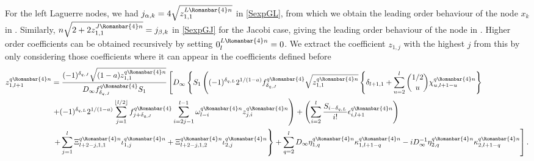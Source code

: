 \documentclass[11pt]{article}
\newcommand{\lln}{L{\tiny\Rleft} n}
\newcommand{\qg}{q}
\newcommand{\ql}{L}
\newcommand{\qj}{J}
\newcommand{\rl}{{\scriptsize \Romanbar{4}} }
\newcommand{\pn}{n}
\numberwithin{equation}{section}
\newcommand{\Rleft}{\Romanbar{4}}
\begin{document}
For the left Laguerre nodes, we had $j_{\alpha,k}= 4\sqrt{z_{1,1}^{\lln}}$ in \cref{SexpGL}, from which we obtain the leading order behaviour of the node $x_k$ in \cite[(5.1)]{quadr}. %
Similarly, $n\sqrt{2+2z_{1,1}^{\qj\rl\pn}} = j_{\beta,k}$ in \cref{SexpGJ} for the Jacobi case, giving the leading order behaviour of the node in \cite[(6.1)]{quadr}. %
Higher order coefficients can be obtained recursively by setting $0_l^{\ql\rl\pn}=0$. We extract the coefficient $z_{1,j}$ with the highest $j$ from this by only considering those coefficients where it can appear in the coefficients defined before
\begin{align}
	z_{1,l+1}^{\qg\rl\pn} & = \frac{ (-1)^{\delta_{\qg,\qj}} \sqrt{ (1-a) z_{1,1}^{\qg\rl\pn}} }{D_\infty  f_{\delta_{\qg,\qj}}^{\qg\rl} S_1 } \left[ D_\infty \left\{ S_1 \left( (-1)^{\delta_{\qg,\ql}} 2^{1/(1-a)} f_{\delta_{\qg,\qj}}^{\qg\rl} \sqrt{z_{1,1}^{\qg\rl\pn}} \left\{ \delta_{l+1,1} +  \sum_{u=2}^{l} {1/2 \choose u} \chi_{u,l+1-u}^{\qg\rl\pn} \right\} \right. \right. \right. \\ %
	& \left. +(-1)^{\delta_{\qg,\ql}} 2^{1/(1-a)}\sum_{j=1}^{\lfloor l/2 \rfloor} f_{j+ \delta_{\qg,\qj}}^{\qg\rl} \sum_{i=2j-1}^{l-1} \omega_{l-i}^{\qg\rl\pn} z_{j,i}^{\qg\rl\pn} \right)   + \left( \sum_{i=2}^{l} \frac{S_{i-\delta_{\qg,\ql} } }{i!}  \epsilon_{i,l+1}^{\qg\rl\pn} \right) \label{EexpNodelln} \\
	& \left. \left. +  \sum_{j=1}^{l} \Xi_{l+2-j,1,1}^{\qg\rl\pn} \iota_{1,j}^{\qg\rl\pn} + \Xi_{l+2-j,1,2}^{\qg\rl\pn} \iota_{2,j}^{\qg\rl\pn} \right\}  +  \sum_{q=2}^l D_\infty \eta_{1,q}^{\qg\rl\pn} \kappa_{1,l+1-q}^{\qg\rl\pn} -i D_\infty^{-1} \eta_{2,q}^{\qg\rl\pn} \kappa_{2,l+1-q}^{\qg\rl\pn} \right].%
\end{align}
\end{document}
